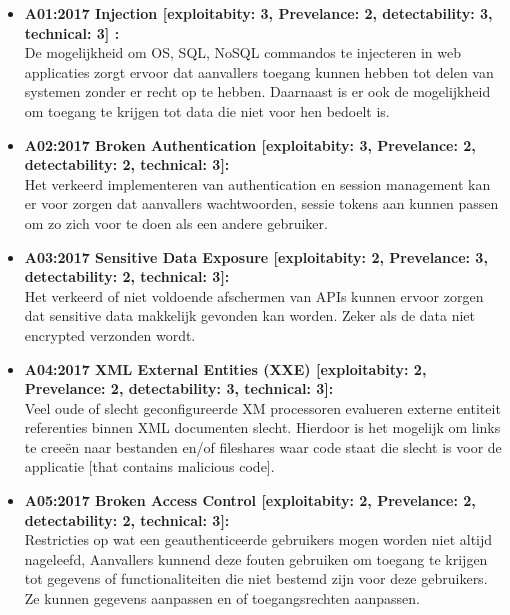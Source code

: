 
\begin{itemize}


\item \textbf{A01:2017 Injection [exploitabity: 3, Prevelance: 2, detectability: 3, technical: 3] :} \\De mogelijkheid om OS, SQL, NoSQL commandos te injecteren in web applicaties zorgt ervoor dat aanvallers toegang kunnen hebben tot delen van systemen zonder er recht op te hebben. Daarnaast is er ook de mogelijkheid om toegang te krijgen tot data die niet voor hen bedoelt is.

\item \textbf{A02:2017 Broken Authentication [exploitabity: 3, Prevelance: 2, detectability: 2, technical: 3]:}\\ Het verkeerd implementeren van authentication en session management kan er voor zorgen dat aanvallers wachtwoorden, sessie tokens aan kunnen passen om zo zich voor te doen als een andere gebruiker.

\item \textbf{A03:2017 Sensitive Data Exposure [exploitabity: 2, Prevelance: 3, detectability: 2, technical: 3]:}\\
Het verkeerd of niet voldoende afschermen van APIs kunnen ervoor zorgen dat sensitive data makkelijk gevonden kan worden. Zeker als de data niet encrypted verzonden wordt.

\item \textbf{A04:2017 XML External Entities (XXE) [exploitabity: 2, Prevelance: 2, detectability: 3, technical: 3]:}\\
Veel oude of slecht geconfigureerde XM processoren evalueren externe entiteit referenties binnen XML documenten slecht. Hierdoor is het mogelijk om links te cree\"en naar bestanden en/of fileshares waar code staat die slecht is voor de applicatie [that contains malicious code].

\item \textbf{A05:2017 Broken Access Control [exploitabity: 2, Prevelance: 2, detectability: 2, technical: 3]:}\\
Restricties op wat een geauthenticeerde gebruikers mogen worden niet altijd nageleefd, Aanvallers kunnend deze fouten gebruiken om toegang te krijgen tot gegevens of functionaliteiten die niet bestemd zijn voor deze gebruikers. Ze kunnen gegevens aanpassen en of toegangsrechten aanpassen.


\end{itemize}
